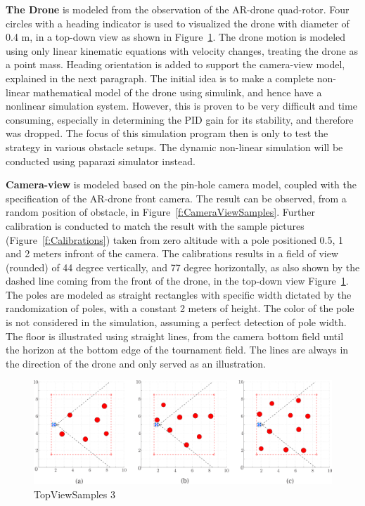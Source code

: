 \textbf{The Drone} is modeled from the observation of the AR-drone quad-rotor. Four circles with a heading indicator is used to visualized the drone with diameter of 0.4 m, in a top-down view as shown in Figure~\ref{f:TopViewSamples}. The drone motion is modeled using only linear kinematic equations with velocity changes, treating the drone as a point mass. Heading orientation is added to support the camera-view model, explained in the next paragraph. The initial idea is to make a complete non-linear mathematical model of the drone using simulink, and hence have a nonlinear simulation system. However, this is proven to be very difficult and time consuming, especially in determining the PID gain for its stability, and therefore was dropped. The focus of this simulation program then is only to test the strategy in various obstacle setups. The dynamic non-linear simulation will be conducted using paparazi simulator instead. 

\textbf{Camera-view} is modeled based on the pin-hole camera model, coupled with the specification of the AR-drone front camera. The result can be observed, from a random position of obstacle, in Figure~\ref{f:CameraViewSamples}. Further calibration is conducted to match the result with the sample pictures (Figure~\ref{f:Calibrations}) taken from zero altitude with a pole positioned 0.5, 1 and 2 meters infront of the camera. The calibrations results in a field of view (rounded) of 44 degree vertically, and 77 degree horizontally, as also shown by the dashed line coming from the front of the drone, in the top-down view Figure~\ref{f:TopViewSamples}. The poles are modeled as straight rectangles with specific width dictated by the randomization of poles, with a constant 2 meters of height. The color of the pole is not considered in the simulation, assuming a perfect detection of pole width. The floor is illustrated using straight lines, from the camera bottom field until the horizon at the bottom edge of the tournament field. The lines are always in the direction of the drone and only served as an illustration.

\begin{figure}
\includegraphics[width=0.9\linewidth]{Figures/TopViewSamples_3.png}
\centering
\caption{TopViewSamples 3}
\label{f:TopViewSamples}
\end{figure} 

